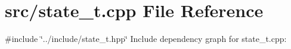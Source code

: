 \section{src/state\+\_\+t.cpp File Reference}
\label{state__t_8cpp}
{\ttfamily \#include \char`\"{}../include/state\+\_\+t.\+hpp\char`\"{}}\newline
Include dependency graph for state\+\_\+t.\+cpp\+:
